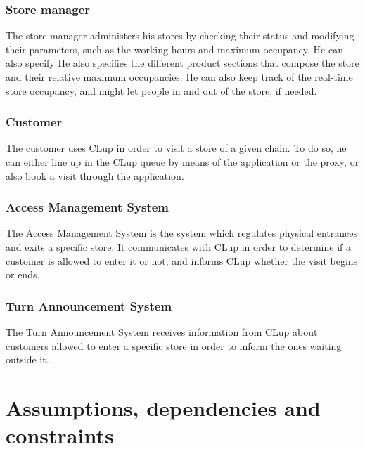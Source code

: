 \documentclass[a4paper,oneside,11pt]{book}   %
\begin{document}
    \subsubsection{Store manager}
    The store manager administers his stores by checking their status and modifying their parameters, such as the working hours and maximum occupancy. He can also specify He also specifies the different product sections that compose the store and their relative maximum occupancies. He can also keep track of the real-time store occupancy, and might let people in and out of the store, if needed.
    \subsubsection{Customer}
    The customer uses CLup in order to visit a store of a given chain. To do so, he can either line up in the CLup queue by means of the application or the proxy, or also book a visit through the application. 
    \subsubsection{Access Management System}
    The Access Management System is the system which regulates physical entrances and exits a specific store. It communicates with CLup in order to determine if a customer is allowed to enter it or not, and informs CLup whether the visit begins or ends.
    \subsubsection{Turn Announcement System}
    The Turn Announcement System receives information from CLup about customers allowed to enter a specific store in order to inform the ones waiting outside it.
    
    \section{Assumptions, dependencies and constraints}
\end{document}
